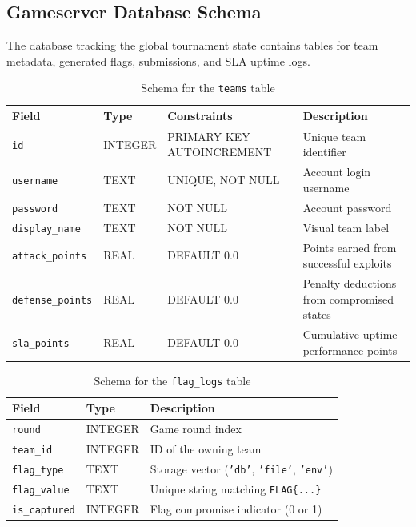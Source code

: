 \documentclass[10pt,journal,compsoc]{article}
\begin{document}
\subsection{Gameserver Database Schema}
The database tracking the global tournament state contains tables for team metadata, generated flags, submissions, and SLA uptime logs.

\begin{table}[h]
\centering
\caption{Schema for the \texttt{teams} table}
\label{tab:teams}
\begin{tabular}{llll}
\toprule
\textbf{Field} & \textbf{Type} & \textbf{Constraints} & \textbf{Description} \\
\midrule
\texttt{id} & INTEGER & PRIMARY KEY AUTOINCREMENT & Unique team identifier \\
\texttt{username} & TEXT & UNIQUE, NOT NULL & Account login username \\
\texttt{password} & TEXT & NOT NULL & Account password \\
\texttt{display\_name} & TEXT & NOT NULL & Visual team label \\
\texttt{attack\_points} & REAL & DEFAULT 0.0 & Points earned from successful exploits \\
\texttt{defense\_points} & REAL & DEFAULT 0.0 & Penalty deductions from compromised states \\
\texttt{sla\_points} & REAL & DEFAULT 0.0 & Cumulative uptime performance points \\
\bottomrule
\end{tabular}
\end{table}

\begin{table}[h]
\centering
\caption{Schema for the \texttt{flag\_logs} table}
\label{tab:flag_logs}
\begin{tabular}{lll}
\toprule
\textbf{Field} & \textbf{Type} & \textbf{Description} \\
\midrule
\texttt{round} & INTEGER & Game round index \\
\texttt{team\_id} & INTEGER & ID of the owning team \\
\texttt{flag\_type} & TEXT & Storage vector (\texttt{'db'}, \texttt{'file'}, \texttt{'env'}) \\
\texttt{flag\_value} & TEXT & Unique string matching \texttt{FLAG\{...\}} \\
\texttt{is\_captured} & INTEGER & Flag compromise indicator (0 or 1) \\
\bottomrule
\end{tabular}
\end{table}
\end{document}
